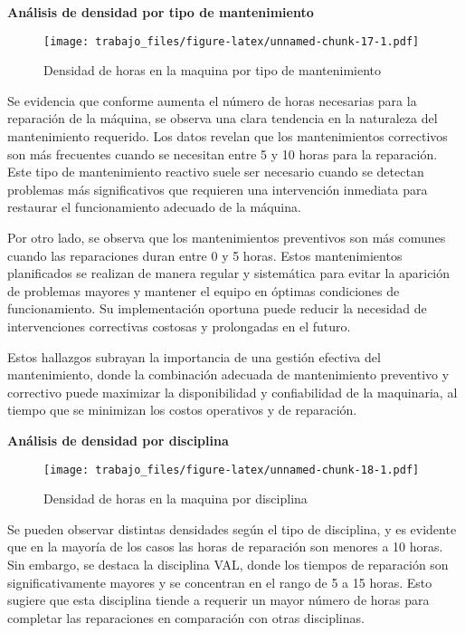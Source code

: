 \documentclass[
  11pt,
  bookmarksnumbered]{article}
\begin{document}
\textbf{Análisis de densidad por tipo de mantenimiento}

\begin{figure}
\centering
\texttt{[image: trabajo\_files/figure-latex/unnamed-chunk-17-1.pdf]}
\caption{\label{fig:unnamed-chunk-17}Densidad de horas en la maquina por tipo de mantenimiento}
\end{figure}

Se evidencia que conforme aumenta el número de horas necesarias para la reparación de la máquina, se observa una clara tendencia en la naturaleza del mantenimiento requerido.
Los datos revelan que los mantenimientos correctivos son más frecuentes cuando se necesitan entre 5 y 10 horas para la reparación.
Este tipo de mantenimiento reactivo suele ser necesario cuando se detectan problemas más significativos que requieren una intervención inmediata para restaurar el funcionamiento adecuado de la máquina.

Por otro lado, se observa que los mantenimientos preventivos son más comunes cuando las reparaciones duran entre 0 y 5 horas.
Estos mantenimientos planificados se realizan de manera regular y sistemática para evitar la aparición de problemas mayores y mantener el equipo en óptimas condiciones de funcionamiento.
Su implementación oportuna puede reducir la necesidad de intervenciones correctivas costosas y prolongadas en el futuro.

Estos hallazgos subrayan la importancia de una gestión efectiva del mantenimiento, donde la combinación adecuada de mantenimiento preventivo y correctivo puede maximizar la disponibilidad y confiabilidad de la maquinaria, al tiempo que se minimizan los costos operativos y de reparación.

\newpage

\textbf{Análisis de densidad por disciplina}

\begin{figure}
\centering
\texttt{[image: trabajo\_files/figure-latex/unnamed-chunk-18-1.pdf]}
\caption{\label{fig:unnamed-chunk-18}Densidad de horas en la maquina por disciplina}
\end{figure}

Se pueden observar distintas densidades según el tipo de disciplina, y es evidente que en la mayoría de los casos las horas de reparación son menores a 10 horas.
Sin embargo, se destaca la disciplina VAL, donde los tiempos de reparación son significativamente mayores y se concentran en el rango de 5 a 15 horas.
Esto sugiere que esta disciplina tiende a requerir un mayor número de horas para completar las reparaciones en comparación con otras disciplinas.
\end{document}
